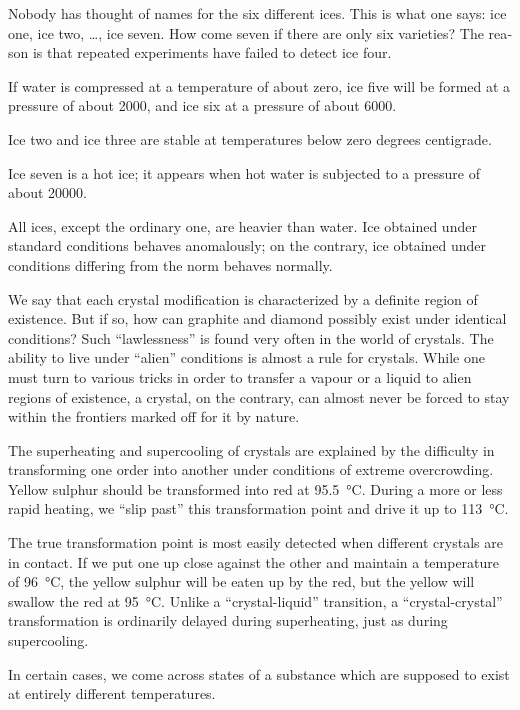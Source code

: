 Nobody has thought of names for the six different ices. This is what one says: ice one, ice two, \ldots, ice seven. How come seven if there are only six varieties? The rea­son is that repeated experiments have failed to detect ice four.

If water is compressed at a temperature of about zero, ice five will be formed at a pressure of about \SI{2000}{\atmos}, and ice six at a pressure of about \SI{6000}{\atmos}.

Ice two and ice three are stable at temperatures below zero degrees centigrade.

Ice seven is a hot ice; it appears when hot water is sub­jected to a pressure of about \SI{20000}{\atmos}.

All ices, except the ordinary one, are heavier than water. Ice obtained under standard conditions behaves anoma­lously; on the contrary, ice obtained under conditions differing from the norm behaves normally.

We say that each crystal modification is characterized by a definite region of existence. But if so, how can graph­ite and diamond possibly exist under identical condi­tions?
Such ``lawlessness'' is found very often in the world of crystals. The ability to live under ``alien'' conditions is almost a rule for crystals. While one must turn to various tricks in order to transfer a vapour or a liquid to alien regions of existence, a crystal, on the contrary, can almost never be forced to stay within the frontiers marked off for it by nature.

The superheating and supercooling of crystals are explained by the difficulty in transforming one order into another under conditions of extreme overcrowding. Yel­low sulphur should be transformed into red at \SI{95.5}{\celsius}. During a more or less rapid heating, we ``slip past'' this transformation point and drive it up to \SI{113}{\celsius}.

The true transformation point is most easily detected when different crystals are in contact. If we put one up close against the other and maintain a temperature of \SI{96}{\celsius}, the yellow sulphur will be eaten up by the red, but the yellow will swallow the red at \SI{95}{\celsius}. Unlike a ``crystal-liquid'' transition, a ``crystal-crystal'' transfor­mation is ordinarily delayed during superheating, just as during supercooling.

In certain cases, we come across states of a substance which are supposed to exist at entirely different temper­atures.

